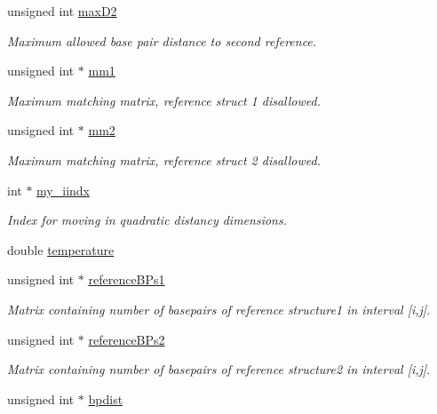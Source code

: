 \begin{DoxyCompactItemize}
unsigned int \mbox{\hyperlink{group__kl__neighborhood__mfe_a03f198a4abdb3b784486d2ba5c533aa4}{max\+D2}}
\begin{DoxyCompactList}\small\item\em Maximum allowed base pair distance to second reference. \end{DoxyCompactList}\item 
unsigned int $\ast$ \mbox{\hyperlink{group__kl__neighborhood__mfe_aa11f5bcd8c4fe70a91c155c877c855d5}{mm1}}
\begin{DoxyCompactList}\small\item\em Maximum matching matrix, reference struct 1 disallowed. \end{DoxyCompactList}\item 
unsigned int $\ast$ \mbox{\hyperlink{group__kl__neighborhood__mfe_a2eaa93316b6beb17531f0c078806036c}{mm2}}
\begin{DoxyCompactList}\small\item\em Maximum matching matrix, reference struct 2 disallowed. \end{DoxyCompactList}\item 
int $\ast$ \mbox{\hyperlink{group__kl__neighborhood__mfe_a1a20cb06b58b75d1a3dbdbc8bc60d0a7}{my\+\_\+iindx}}
\begin{DoxyCompactList}\small\item\em Index for moving in quadratic distancy dimensions. \end{DoxyCompactList}\item 
double \mbox{\hyperlink{group__kl__neighborhood__mfe_aaaecad48586cf29db9cfe78ba0d03e64}{temperature}}
\item 
unsigned int $\ast$ \mbox{\hyperlink{group__kl__neighborhood__mfe_a536525b98c1b633d4c5f2da4f8d78c18}{reference\+B\+Ps1}}
\begin{DoxyCompactList}\small\item\em Matrix containing number of basepairs of reference structure1 in interval \mbox{[}i,j\mbox{]}. \end{DoxyCompactList}\item 
unsigned int $\ast$ \mbox{\hyperlink{group__kl__neighborhood__mfe_aa7abf73c3114cb5f0dc90e702fa9dd0f}{reference\+B\+Ps2}}
\begin{DoxyCompactList}\small\item\em Matrix containing number of basepairs of reference structure2 in interval \mbox{[}i,j\mbox{]}. \end{DoxyCompactList}\item 
unsigned int $\ast$ \mbox{\hyperlink{group__kl__neighborhood__mfe_af1106e1a592e2dccc92b3452340549e0}{bpdist}}

\end{DoxyCompactItemize}
